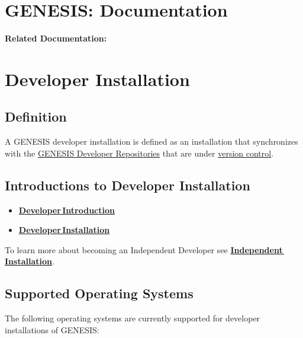 \documentclass[12pt]{article}
\begin{document}
\section*{GENESIS: Documentation}

{\bf Related Documentation:} \\

\section*{Developer Installation}

\subsection*{Definition}


A GENESIS developer installation is defined as an installation that synchronizes with the \href{../developer-repository/developer-repository.tex}{GENESIS Developer Repositories}
 that are under \href{../version-control/version-control.tex}{version control}.

\subsection*{Introductions to Developer Installation}

\begin{itemize}
   \item[]\href{../developer-intro/developer-intro.tex}{\bf Developer\,Introduction}
   \item[]\href{../installation-developer/installation-developer.tex}{\bf Developer\,Installation}
\end{itemize}
To learn more about becoming an Independent Developer see \href{../installation-independent/installation-independent.tex}{\bf Independent\,Installation}.

\subsection*{Supported Operating Systems}

The following operating systems are currently supported for developer installations of GENESIS:
\end{document}
